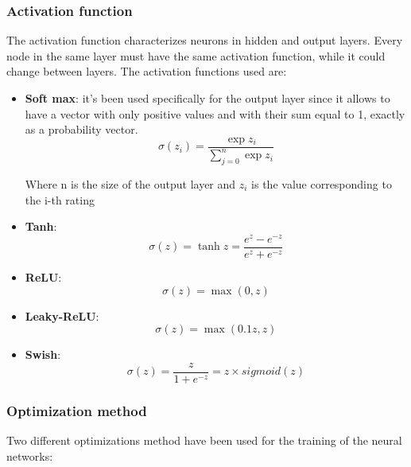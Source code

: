 \documentclass{article}
\begin{document}
\subsubsection{Activation function}
The activation function characterizes neurons in hidden and output layers. Every node in the same layer must have the same activation function, while it could change between layers.
The activation functions used are:

\begin{itemize}
    \item \textbf{Soft max}: it's been used specifically for the output layer since it allows to have a vector with only positive values and with their sum equal to 1, exactly as a probability vector. 
    \begin{equation}\nonumber
        \sigma(z_i) = \frac{\exp{z_i}}{\sum_{j=0}^n \exp{z_i}}
    \end{equation}
    
    Where n is the size of the output layer and $z_i$ is the value corresponding to the i-th rating 
    
    \item \textbf{Tanh}: 
    \begin{equation}\nonumber
        \sigma(z) = \tanh{z} = \frac{e^{z} - e^{-z}}{e^{z} + e^{-z}}
    \end{equation}
    
    \item \textbf{ReLU}:
    \begin{equation}\nonumber
        \sigma(z) = \max(0 , z)
    \end{equation}
    
    \item \textbf{Leaky-ReLU}:
    \begin{equation}\nonumber
        \sigma(z) = \max(0.1z , z)
    \end{equation}
    
    \item \textbf{Swish}:
    \begin{equation}\nonumber
        \sigma(z) = \frac{z}{1 + e^{-z}} = z \times sigmoid(z)
    \end{equation}
\end{itemize}

\subsubsection{Optimization method}
Two different optimizations method have been used for the training of the neural networks:
\end{document}
